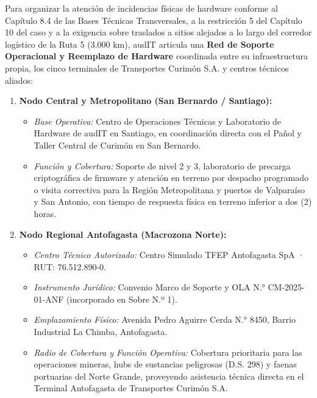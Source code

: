 Para organizar la atención de incidencias físicas de hardware conforme al Capítulo 8.4 de las Bases Técnicas Transversales, a la restricción 5 del Capítulo 10 del caso y a la exigencia  sobre traslados a sitios alejados a lo largo del corredor logístico de la Ruta 5 (3.000 km), audIT articula una \textbf{Red de Soporte Operacional y Reemplazo de Hardware} coordinada entre su infraestructura propia, los cinco terminales de Transportes Curimón S.A. y centros técnicos aliados:

\begin{enumerate}
  \item \textbf{Nodo Central y Metropolitano (San Bernardo / Santiago):}
  \begin{itemize}
    \item \textit{Base Operativa:} Centro de Operaciones Técnicas y Laboratorio de Hardware de audIT en Santiago, en coordinación directa con el Pañol y Taller Central de Curimón en San Bernardo.
    \item \textit{Función y Cobertura:} Soporte de nivel 2 y 3, laboratorio de precarga criptográfica de firmware y atención en terreno por despacho programado o visita correctiva para la Región Metropolitana y puertos de Valparaíso y San Antonio, con tiempo de respuesta física en terreno inferior a dos (2) horas.
  \end{itemize}

  \item \textbf{Nodo Regional Antofagasta (Macrozona Norte):}
  \begin{itemize}
    \item \textit{Centro Técnico Autorizado:} Centro Simulado TFEP Antofagasta SpA · RUT: 76.512.890-0.
    \item \textit{Instrumento Jurídico:} Convenio Marco de Soporte y OLA N.° CM-2025-01-ANF (incorporado en Sobre N.º 1).
    \item \textit{Emplazamiento Físico:} Avenida Pedro Aguirre Cerda N.° 8450, Barrio Industrial La Chimba, Antofagasta.
    \item \textit{Radio de Cobertura y Función Operativa:} Cobertura prioritaria para las operaciones mineras, hubs de sustancias peligrosas (D.S. 298) y faenas portuarias del Norte Grande, proveyendo asistencia técnica directa en el Terminal Antofagasta de Transportes Curimón S.A.
  \end{itemize}


\end{enumerate}
